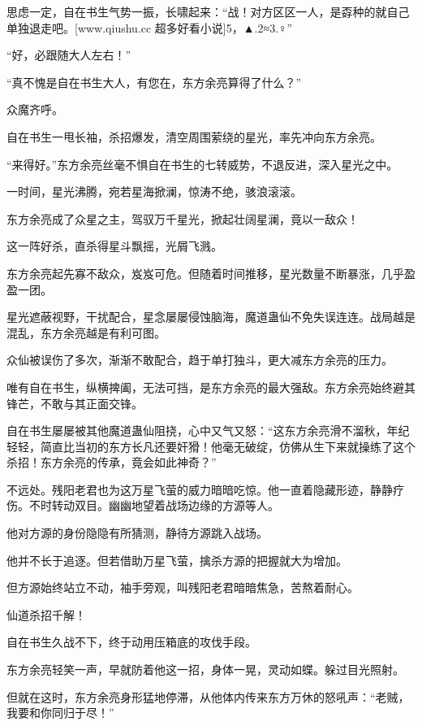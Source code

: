 
\begin{this_body}

思虑一定，自在书生气势一振，长啸起来：“战！对方区区一人，是孬种的就自己单独退走吧。[www.qiushu.cc 超多好看小说]5，▲.2≈3.♀”

“好，必跟随大人左右！”

“真不愧是自在书生大人，有您在，东方余亮算得了什么？”

众魔齐呼。

自在书生一甩长袖，杀招爆发，清空周围萦绕的星光，率先冲向东方余亮。

“来得好。”东方余亮丝毫不惧自在书生的七转威势，不退反进，深入星光之中。

一时间，星光沸腾，宛若星海掀澜，惊涛不绝，骇浪滚滚。

东方余亮成了众星之主，驾驭万千星光，掀起壮阔星澜，竟以一敌众！

这一阵好杀，直杀得星斗飘摇，光屑飞溅。

东方余亮起先寡不敌众，岌岌可危。但随着时间推移，星光数量不断暴涨，几乎盈盈一团。

星光遮蔽视野，干扰配合，星念屡屡侵蚀脑海，魔道蛊仙不免失误连连。战局越是混乱，东方余亮越是有利可图。

众仙被误伤了多次，渐渐不敢配合，趋于单打独斗，更大减东方余亮的压力。

唯有自在书生，纵横捭阖，无法可挡，是东方余亮的最大强敌。东方余亮始终避其锋芒，不敢与其正面交锋。

自在书生屡屡被其他魔道蛊仙阻挠，心中又气又怒：“这东方余亮滑不溜秋，年纪轻轻，简直比当初的东方长凡还要奸猾！他毫无破绽，仿佛从生下来就操练了这个杀招！东方余亮的传承，竟会如此神奇？”

不远处。残阳老君也为这万星飞萤的威力暗暗吃惊。他一直着隐藏形迹，静静疗伤。不时转动双目。幽幽地望着战场边缘的方源等人。

他对方源的身份隐隐有所猜测，静待方源跳入战场。

他并不长于追逐。但若借助万星飞萤，擒杀方源的把握就大为增加。

但方源始终站立不动，袖手旁观，叫残阳老君暗暗焦急，苦熬着耐心。

仙道杀招千解！

自在书生久战不下，终于动用压箱底的攻伐手段。

东方余亮轻笑一声，早就防着他这一招，身体一晃，灵动如蝶。躲过目光照射。

但就在这时，东方余亮身形猛地停滞，从他体内传来东方万休的怒吼声：“老贼，我要和你同归于尽！”


\end{this_body}
